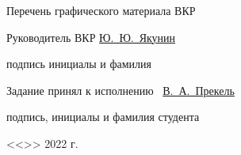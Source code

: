 \begin{spacing}{1}
{        \uline{\hfill}

        \uline{\hfill}

        Перечень графического материала ВКР \uline{\hfill}

        \uline{\hfill}

        \uline{\hfill}

        \uline{\hfill}

        \vfill

        Руководитель ВКР
        \hfill
        \uline{\hspace{10.5ex}}
        \hspace{6ex}
        \uline{Ю.~Ю.~Якунин}

        \vspace{-4pt}

        \hfill
        {\footnotesize подпись}
        \hspace{8.5ex}
        {\footnotesize инициалы и фамилия}

        Задание принял к исполнению~
        \hfill
        \uline{\hspace{18.5ex}В.~А.~Прекель}

        \vspace{-4pt}

        \hfill
        {\footnotesize подпись, инициалы и фамилия студента}

        \vspace{1em}

        \hfill <<\uline{\hspace{3ex}}>> \uline{\hspace{9ex}} 2022 г.
    }
\end{spacing}


\clearpage

\setcounter{page}{2}

